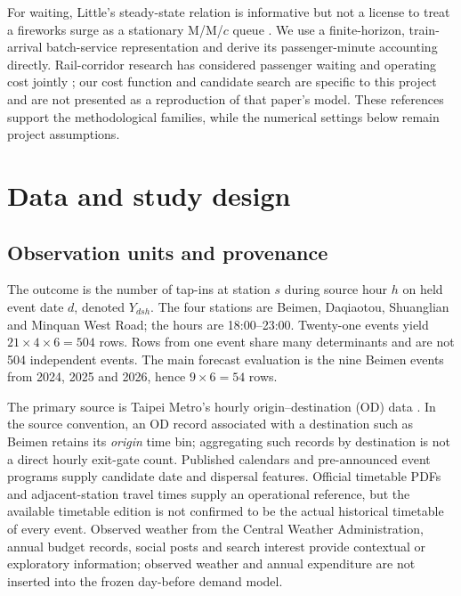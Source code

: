 For waiting, Little's steady-state relation is informative but not a license to treat a fireworks surge as a stationary M/M/$c$ queue \cite{little}. We use a finite-horizon, train-arrival batch-service representation and derive its passenger-minute accounting directly. Rail-corridor research has considered passenger waiting and operating cost jointly \cite{pan}; our cost function and candidate search are specific to this project and are not presented as a reproduction of that paper's model. These references support the methodological families, while the numerical settings below remain project assumptions.

\section{Data and study design}
\subsection{Observation units and provenance}
The outcome is the number of tap-ins at station $s$ during source hour $h$ on held event date $d$, denoted $Y_{dsh}$. The four stations are Beimen, Daqiaotou, Shuanglian and Minquan West Road; the hours are 18:00--23:00. Twenty-one events yield $21\times4\times6=504$ rows. Rows from one event share many determinants and are not 504 independent events. The main forecast evaluation is the nine Beimen events from 2024, 2025 and 2026, hence $9\times6=54$ rows.

The primary source is Taipei Metro's hourly origin--destination (OD) data \cite{metrodata}. In the source convention, an OD record associated with a destination such as Beimen retains its \emph{origin} time bin; aggregating such records by destination is not a direct hourly exit-gate count. Published calendars and pre-announced event programs supply candidate date and dispersal features. Official timetable PDFs and adjacent-station travel times supply an operational reference, but the available timetable edition is not confirmed to be the actual historical timetable of every event. Observed weather from the Central Weather Administration, annual budget records, social posts and search interest provide contextual or exploratory information; observed weather and annual expenditure are not inserted into the frozen day-before demand model.

